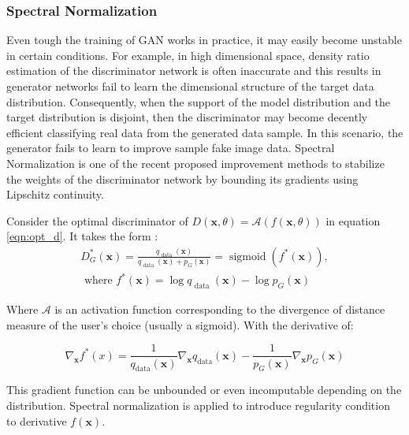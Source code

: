 \subsubsection{Spectral Normalization}
\label{sec:alad_sn}

Even tough the training of GAN works in practice, it may easily become unstable in certain
conditions. For example, in high dimensional space, density ratio estimation of the discriminator
network is often inaccurate and this results in generator networks fail to learn the dimensional
structure of the target data distribution. \cite{methods} Consequently, when the support of the model
distribution and the target distribution is disjoint, then the discriminator may become decently
efficient classifying real data from the generated data sample. In this scenario, the generator
fails to learn to improve sample fake image data. Spectral Normalization is one of the recent
proposed improvement methods to stabilize the weights of the discriminator network by bounding its
gradients using Lipschitz continuity. \cite{inproceedings_sn} 

Consider the optimal discriminator of $D(\boldsymbol{x}, \theta)=\mathcal{A}(f(\boldsymbol{x}, \theta))$ in equation \ref{eqn:opt_d}. It takes the form :
\begin{multline}
    D_{G}^{*}(\boldsymbol{x})=\frac{q_{\text { data }}(\boldsymbol{x})}{q_{\text { data }}(\boldsymbol{x})+p_{G}(\boldsymbol{x})}=\operatorname{sigmoid}\left(f^{*}(\boldsymbol{x})\right), \\ \text { where } f^{*}(\boldsymbol{x})=\log q_{\text { data }}(\boldsymbol{x})-\log p_{G}(\boldsymbol{x}) 
\end{multline}

Where $\mathcal{A}$ is an activation function corresponding to the divergence of distance measure of the
user’s choice (usually a sigmoid). With the derivative of: 

\begin{equation}
    \nabla_{\boldsymbol{x}} f^{*}(x)=\frac{1}{q_{\mathrm{data}}(\boldsymbol{x})} \nabla_{\boldsymbol{x}} q_{\mathrm{data}}(\boldsymbol{x})-\frac{1}{p_{G}(\boldsymbol{x})} \nabla_{\boldsymbol{x}} p_{G}(\boldsymbol{x})  
\end{equation}

This gradient function can be unbounded or even incomputable depending on the distribution. Spectral
normalization is applied to introduce regularity condition to derivative $f(\boldsymbol{x})$.
\cite{inproceedings_sn} 


